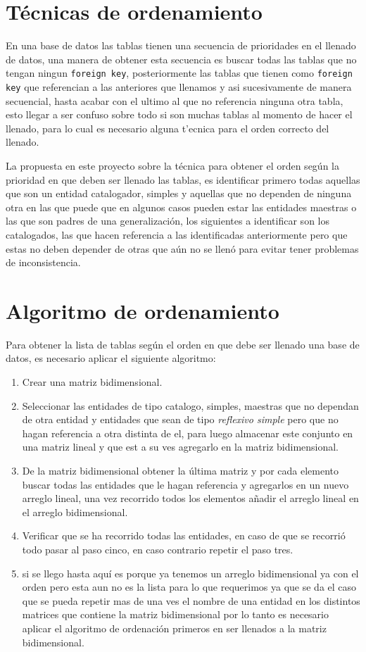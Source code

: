 \section{T\'ecnicas de ordenamiento}
En una base de datos las tablas tienen una secuencia de prioridades en el llenado de datos, una manera de obtener esta secuencia es buscar todas las tablas que no tengan ningun \texttt{foreign key}, posteriormente las tablas que tienen como \texttt{foreign key} que referencian a las anteriores que llenamos y asi sucesivamente de manera secuencial, hasta acabar con el ultimo al que no referencia ninguna otra tabla, esto llegar a ser confuso sobre todo si son muchas tablas al momento de hacer el llenado, para lo cual es necesario alguna t'ecnica para el orden correcto del llenado.

La propuesta en este proyecto sobre la t\'ecnica para obtener el orden seg\'un la prioridad en que deben ser llenado las tablas, es identificar primero todas aquellas que son un entidad catalogador, simples y  aquellas que no dependen de ninguna otra en las que puede que en algunos casos pueden estar las entidades maestras  o las que son padres de una generalizaci\'on, los  siguientes a identificar son los catalogados, las que hacen referencia a las identificadas anteriormente pero que estas no deben depender de otras que a\'un no se llen\'o para evitar  tener problemas de inconsistencia. 
\section{Algoritmo de ordenamiento}
\label{Algoritmo de ordenamiento}
Para obtener la lista de tablas seg\'un el orden en que debe ser llenado una base de datos,  es necesario aplicar el siguiente algoritmo:
\begin{enumerate}
\item Crear una matriz bidimensional.
\item Seleccionar las entidades de tipo catalogo, simples, maestras que no dependan de otra entidad y entidades que sean de tipo \textit{reflexivo simple} pero que no hagan referencia a otra distinta de el, para luego almacenar este conjunto en una matriz lineal y que est a su ves agregarlo en la matriz bidimensional.
\item De la matriz bidimensional obtener la \'ultima matriz y por cada elemento buscar todas las entidades que le hagan referencia y agregarlos en un nuevo arreglo lineal, una vez recorrido todos los elementos a\~nadir el arreglo lineal en el arreglo bidimensional.
\item Verificar que se ha recorrido todas las entidades, en caso de que se recorri\'o todo pasar al paso cinco, en caso contrario repetir el paso tres.
\item si se llego hasta aqu\'i es porque ya tenemos un arreglo bidimensional ya con el orden pero esta aun no es la lista para lo que requerimos ya que se da el caso que se pueda repetir mas de una ves el nombre de una entidad en los distintos matrices que contiene la matriz bidimensional por lo tanto es necesario aplicar el algoritmo de ordenaci\'on primeros en ser llenados a la matriz bidimensional.
\end{enumerate}
